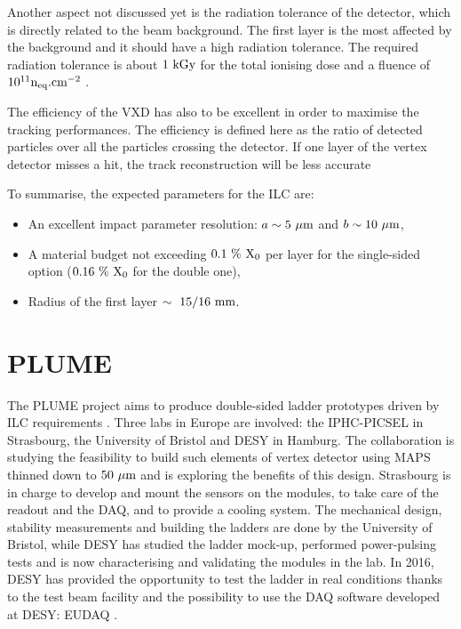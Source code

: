    Another aspect not discussed yet is the radiation tolerance of the detector, which is directly related to the beam background.
   The first layer is the most affected by the background and it should have a high radiation tolerance. 
   The required radiation tolerance is about $1~\rm{kGy}$ for the total ionising dose and a fluence of $10^{11}\rm{n}_{\rm{eq}}\rm{.cm}^{-2}$ \cite{Behnke2013}.

   The efficiency of the \gls{VXD} has also to be excellent in order to maximise the tracking performances.
   The efficiency is defined here as the ratio of detected particles over all the particles crossing the detector.
   If one layer of the vertex detector misses a hit, the track reconstruction will be less accurate 
   

   To summarise, the expected parameters for the \gls{ILC} are: 
   \begin{itemize}
     \item An excellent impact parameter resolution: $a \sim 5~\rm{\mu m}$ and $b \sim 10~\rm{\mu m}$,
     \item A material budget not exceeding $0.1~\%~\rm{X_0}$ per layer for the single-sided option ($0.16~\%~\rm{X_0}$ for the double one),
     \item Radius of the first layer $\sim~15/16~\rm{mm}$.
   \end{itemize}

  \section{PLUME}

  The \acrfull{PLUME} project aims to produce double-sided ladder prototypes driven by \gls{ILC} requirements \cite{PLUME}.
  Three labs in Europe are involved: the \gls{IPHC}-\gls{PICSEL} in Strasbourg, the University of Bristol and \gls{DESY} in Hamburg.
  The collaboration is studying the feasibility to build such elements of vertex detector using \gls{MAPS} thinned down to $50~\rm{\mu m}$ and is exploring the benefits of this design.
  Strasbourg is in charge to develop and mount the sensors on the modules, to take care of the readout and the \gls{DAQ}, and to provide a cooling system.
  The mechanical design, stability measurements and building the ladders are done by the University of Bristol, while \gls{DESY} has studied the ladder mock-up, performed power-pulsing tests and is now characterising and validating the modules in the lab.
  In 2016, DESY has provided the opportunity to test the ladder in real conditions thanks to the test beam facility and the possibility to use the \gls{DAQ} software developed at DESY: EUDAQ \cite{EUDAQ}.

